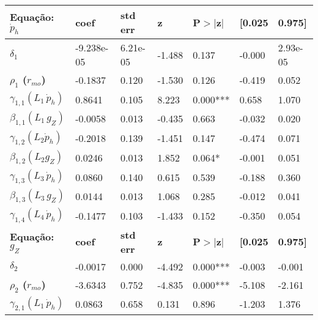 \centering
\label{Estimacao_Infla}
\begin{threeparttable}
	\begin{tabular}{l|llllll}
		\hline\hline
		\textbf{Equação: } $\dot p_h$ & \textbf{coef} & \textbf{std err} & \textbf{z} & \textbf{P$> |$z$|$} & \textbf{[0.025} & \textbf{0.975]}  \\
		\hline
		\textbf{$\delta_1$}  &   -9.238e-05  &     6.21e-05     &    -1.488  &         0.137        &       -0.000    &     2.93e-05     \\
		\textbf{$\rho_1$ ($r_{mo}$)}       &      -0.1837  &        0.120     &    -1.530  &         0.126        &       -0.419    &        0.052     \\
		$\gamma_{1,1} (L_1\, \dot p_h)$ &       0.8641  &        0.105     &     8.223  &         0.000***        &        0.658    &        1.070     \\
		$\beta_{1,1} (L_1\, g_Z)$       &      -0.0058  &        0.013     &    -0.435  &         0.663        &       -0.032    &        0.020     \\
		$\gamma_{1,2} (L_2 \dot p_h)$ &      -0.2018  &        0.139     &    -1.451  &         0.147        &       -0.474    &        0.071     \\
		$\beta_{1,2} (L_2 g_Z)$       &       0.0246  &        0.013     &     1.852  &         0.064*        &       -0.001    &        0.051     \\
		$\gamma_{1,3} (L_3\, \dot p_h)$ &       0.0860  &        0.140     &     0.615  &         0.539        &       -0.188    &        0.360     \\
		$\beta_{1,3} (L_3\, g_Z)$       &       0.0144  &        0.013     &     1.068  &         0.285        &       -0.012    &        0.041     \\
		$\gamma_{1,4} (L_4\, \dot p_h)$ &      -0.1477  &        0.103     &    -1.433  &         0.152        &       -0.350    &        0.054     \\\hline
		\textbf{Equação: } $g_Z$& \textbf{coef} & \textbf{std err} & \textbf{z} & \textbf{P$> |$z$|$} & \textbf{[0.025} & \textbf{0.975]}  \\
		\hline
		\textbf{$\delta_2$}  &      -0.0017  &        0.000     &    -4.492  &         0.000***        &       -0.003    &       -0.001     \\
		\textbf{$\rho_2$ ($r_{mo}$)}       &      -3.6343  &        0.752     &    -4.835  &         0.000***        &       -5.108    &       -2.161     \\
		$\gamma_{2,1} (L_1\, \dot p_h)$ &       0.0863  &        0.658     &     0.131  &         0.896        &       -1.203    &        1.376     \\

\end{tabular}
\end{threeparttable}

